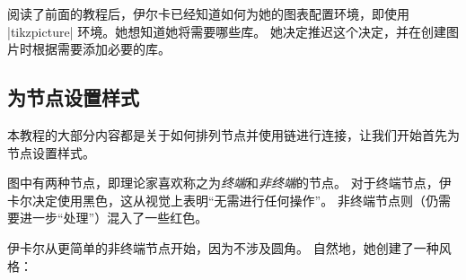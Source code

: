 
阅读了前面的教程后，伊尔卡已经知道如何为她的图表配置环境，即使用 |tikzpicture| 环境。她想知道她将需要哪些库。 她决定推迟这个决定，并在创建图片时根据需要添加必要的库。


\subsection{为节点设置样式}


本教程的大部分内容都是关于如何排列节点并使用链进行连接，让我们开始首先为节点设置样式。


图中有两种节点，即理论家喜欢称之为\emph{终端}和\emph{非终端}的节点。 对于终端节点，伊卡尔决定使用黑色，这从视觉上表明``无需进行任何操作''。 非终端节点则（仍需要进一步``处理''）混入了一些红色。


伊卡尔从更简单的非终端节点开始，因为不涉及圆角。 自然地，她创建了一种风格：

%
\begin{codeexample}[preamble={\usetikzlibrary{positioning}}]
\end{codeexample}
%

